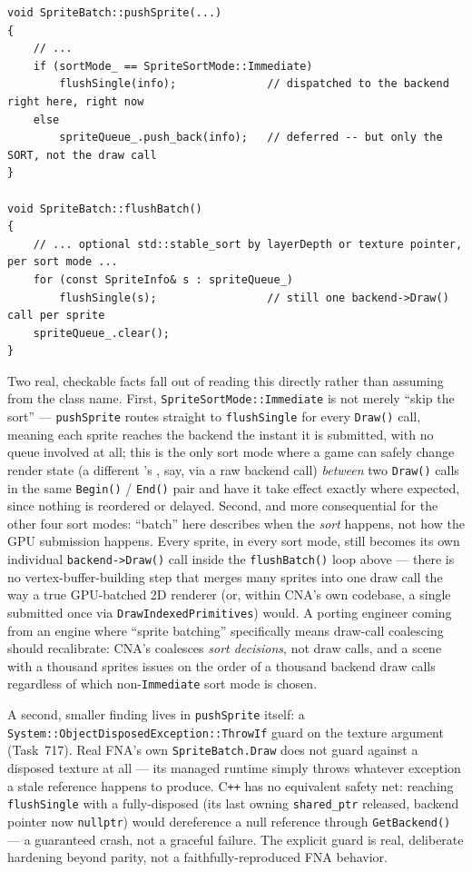 \begin{lstlisting}
void SpriteBatch::pushSprite(...)
{
    // ...
    if (sortMode_ == SpriteSortMode::Immediate)
        flushSingle(info);              // dispatched to the backend right here, right now
    else
        spriteQueue_.push_back(info);   // deferred -- but only the SORT, not the draw call
}

void SpriteBatch::flushBatch()
{
    // ... optional std::stable_sort by layerDepth or texture pointer, per sort mode ...
    for (const SpriteInfo& s : spriteQueue_)
        flushSingle(s);                 // still one backend->Draw() call per sprite
    spriteQueue_.clear();
}
\end{lstlisting}

Two real, checkable facts fall out of reading this directly rather than assuming from the
class name. First, \texttt{SpriteSortMode::Immediate} is not merely ``skip the sort'' ---
\texttt{pushSprite} routes straight to \texttt{flushSingle} for every \texttt{Draw()} call,
meaning each sprite reaches the backend the instant it is submitted, with no queue involved at
all; this is the only sort mode where a game can safely change render state (a different
's , say, via a raw backend call) \emph{between}
two \texttt{Draw()} calls in the same \texttt{Begin()} / \texttt{End()} pair and have it take
effect exactly where expected, since nothing is reordered or delayed. Second, and more
consequential for the other four sort modes: ``batch'' here describes when the \emph{sort}
happens, not how the GPU submission happens. Every sprite, in every sort mode, still becomes
its own individual \texttt{backend->Draw()} call inside the \texttt{flushBatch()} loop above
--- there is no vertex-buffer-building step that merges many sprites into one draw call the
way a true GPU-batched 2D renderer (or, within CNA's own codebase, a single
 submitted once via \texttt{DrawIndexedPrimitives}) would. A porting
engineer coming from an engine where ``sprite batching'' specifically means draw-call
coalescing should recalibrate: CNA's  coalesces \emph{sort decisions},
not draw calls, and a scene with a thousand sprites issues on the order of a thousand backend
draw calls regardless of which non-\texttt{Immediate} sort mode is chosen.

A second, smaller finding lives in \texttt{pushSprite} itself: a
\texttt{System::ObjectDisposedException::ThrowIf} guard on the texture argument (Task~717).
Real FNA's own \texttt{SpriteBatch.Draw} does not guard against a disposed texture at all ---
its managed runtime simply throws whatever exception a stale reference happens to produce.
C\texttt{++} has no equivalent safety net: reaching \texttt{flushSingle} with a fully-disposed
 (its last owning \texttt{shared\_ptr} released, backend pointer now
\texttt{nullptr}) would dereference a null  reference through
\texttt{GetBackend()} --- a guaranteed crash, not a graceful failure. The explicit guard is
real, deliberate hardening beyond parity, not a faithfully-reproduced FNA behavior.

